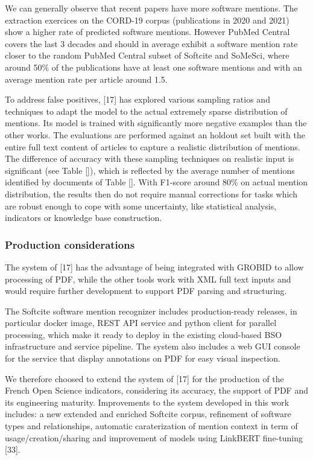 \documentclass[
]{article}
\begin{document}
We can generally observe that recent papers have more software mentions.
The extraction exercices on the CORD-19 corpus (publications in 2020 and
2021) show a higher rate of predicted software mentions. However PubMed
Central covers the last 3 decades and should in average exhibit a
software mention rate closer to the random PubMed Central subset of
Softcite and SoMeSci, where around 50\% of the publications have at
least one software mentions and with an average mention rate per article
around 1.5.

To address false positives, {[}17{]} has explored various sampling
ratios and techniques to adapt the model to the actual extremely sparse
distribution of mentions. Its model is trained with significantly more
negative examples than the other works. The evaluations are performed
against an holdout set built with the entire full text content of
articles to capture a realistic distribution of mentions. The difference
of accuracy with these sampling techniques on realistic input is
significant (see Table {[}{]}), which is reflected by the average number
of mentions identified by documents of Table {[}{]}. With F1-score
around 80\% on actual mention distribution, the results then do not
require manual corrections for tasks which are robust enough to cope
with some uncertainty, like statistical analysis, indicators or
knowledge base construction.

\hypertarget{production-considerations}{%
\subsubsection{Production
considerations}\label{production-considerations}}

The system of {[}17{]} has the advantage of being integrated with GROBID
to allow processing of PDF, while the other tools work with XML full
text inputs and would require further development to support PDF parsing
and structuring.

The Softcite software mention recognizer includes production-ready
releases, in particular docker image, REST API service and python client
for parallel processing, which make it ready to deploy in the existing
cloud-based BSO infrastructure and service pipeline. The system also
includes a web GUI console for the service that display annotations on
PDF for easy visual inspection.

We therefore choosed to extend the system of {[}17{]} for the production
of the French Open Science indicators, considering its accuracy, the
support of PDF and its engineering maturity. Improvements to the system
developed in this work includes: a new extended and enriched Softcite
corpus, refinement of software types and relationships, automatic
caraterization of mention context in term of usage/creation/sharing and
improvement of models using LinkBERT fine-tuning {[}33{]}.
\end{document}
